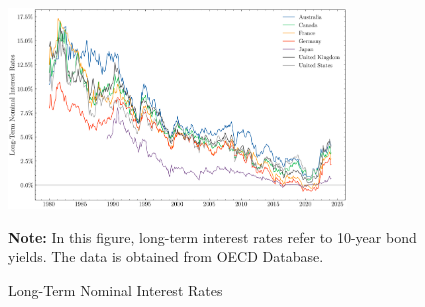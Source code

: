 \begin{figure}[H]
    \centering
    \caption{Long-Term Nominal Interest Rates}
    \includegraphics[width=0.8\textwidth]{figures/long-term-rates.png}
    
    \vspace{15pt}
    
    \begin{minipage}{\textwidth}
        \footnotesize %
        \textbf{Note:} In this figure, long-term interest rates refer to 10-year bond yields. The data is obtained from OECD Database.
    \end{minipage}
    \label{fig:long-term-rates}
\end{figure}

\newpage


